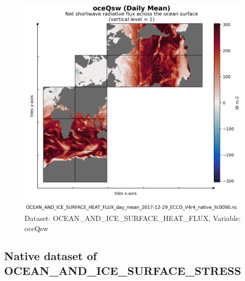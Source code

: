 \begin{figure}[H]
\centering
\includegraphics[scale=0.55]{../images/plots/v4r4/native_plots/Ocean_and_Sea-Ice_Surface_Heat_Fluxes/oceQsw.png}
\caption{Dataset: OCEAN\_AND\_ICE\_SURFACE\_HEAT\_FLUX, Variable: oceQsw}
\label{tab:table-OCEAN_AND_ICE_SURFACE_HEAT_FLUX_oceQsw-Plot}
\end{figure}
\newpage
\subsection{Native dataset of OCEAN\_AND\_ICE\_SURFACE\_STRESS}
\newp
